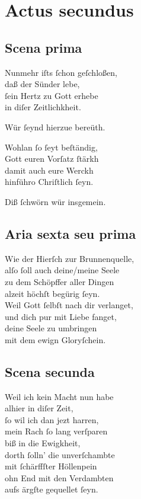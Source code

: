 \documentclass{ees}
\newenvironment{lyrics}[1]{%
  \subsection{#1}\nopagebreak%
  \begin{lyricslist}%
  \let\voice\item%
}{%
  \end{lyricslist}%
}
\newcommand\voiceBarmherzigkeit{\voice[Barmh.]}
\newcommand\voiceGerechtigkeit{\voice[Gerecht.]}
\begin{document}
\section{Actus secundus}

\begin{lyrics}{Scena prima}
  \voiceBarmherzigkeit
  Nunmehr iſts ſchon geſchloßen,\\
  daß der Sünder lebe,\\
  ſein Hertz zu Gott erhebe\\
  in diſer Zeitlichkheit.

  \voice[alle]
  Wür ſeynd hierzue bereüth.

  \voiceBarmherzigkeit
  Wohlan ſo ſeyt beſtändig,\\
  Gott euren Vorſatz ſtärkh\\
  damit auch eure Werckh\\
  hinführo Chriſtlich ſeyn.

  \voice[alle]
  Diß ſchwörn wür insgemein.
\end{lyrics}

\clearpage
\begin{lyrics}{Aria sexta seu prima}
  \voiceBarmherzigkeit
  Wie der Hierſch zur Brunnenquelle,\\
  alſo ſoll auch deine/meine Seele\\
  zu dem Schöpffer aller Dingen\\
  alzeit höchſt begürig ſeyn.\\[1ex]
  Weil Gott ſelbſt nach dir verlanget,\\
  und dich pur mit Liebe fanget,\\
  deine Seele zu umbringen\\
  mit dem ewign Gloryſchein.
\end{lyrics}

\begin{lyrics}{Scena secunda}
  \voiceGerechtigkeit
  Weil ich kein Macht nun habe\\
  alhier in diſer Zeit,\\
  ſo wil ich dan jezt harren,\\
  mein Rach ſo lang verſparen\\
  biß in die Ewigkheit,\\
  dorth ſolln’ die unverſchambte\\
  mit ſchärffſter Höllenpein\\
  ohn End mit den Verdambten\\
  aufs ärgſte gequellet ſeyn.
\end{lyrics}
\end{document}
